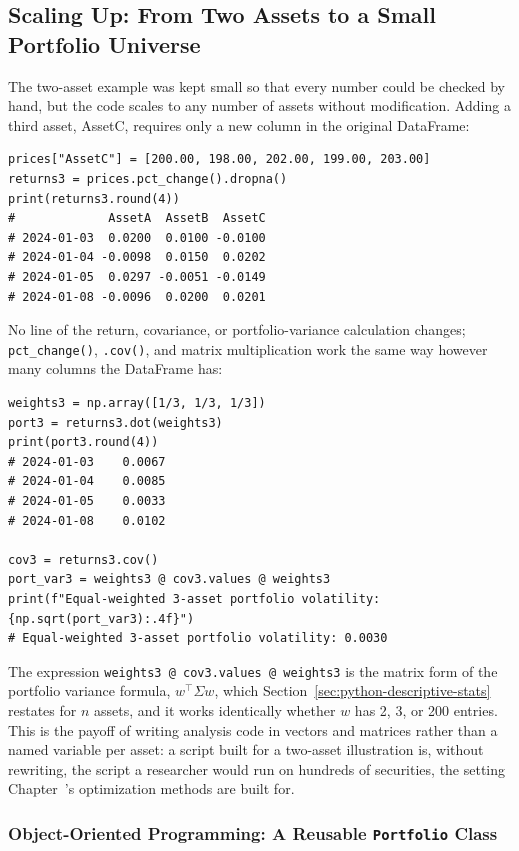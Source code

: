 \documentclass[../ai_in_finance]{subfiles}
\begin{document}
\subsection{Scaling Up: From Two Assets to a Small Portfolio Universe}

The two-asset example was kept small so that every number could be checked by hand, but the code scales to any number of assets without modification. Adding a third asset, AssetC, requires only a new column in the original DataFrame:

\begin{verbatim}
prices["AssetC"] = [200.00, 198.00, 202.00, 199.00, 203.00]
returns3 = prices.pct_change().dropna()
print(returns3.round(4))
#             AssetA  AssetB  AssetC
# 2024-01-03  0.0200  0.0100 -0.0100
# 2024-01-04 -0.0098  0.0150  0.0202
# 2024-01-05  0.0297 -0.0051 -0.0149
# 2024-01-08 -0.0096  0.0200  0.0201
\end{verbatim}

No line of the return, covariance, or portfolio-variance calculation changes; \texttt{pct\_change()}, \texttt{.cov()}, and matrix multiplication work the same way however many columns the DataFrame has:

\begin{verbatim}
weights3 = np.array([1/3, 1/3, 1/3])
port3 = returns3.dot(weights3)
print(port3.round(4))
# 2024-01-03    0.0067
# 2024-01-04    0.0085
# 2024-01-05    0.0033
# 2024-01-08    0.0102

cov3 = returns3.cov()
port_var3 = weights3 @ cov3.values @ weights3
print(f"Equal-weighted 3-asset portfolio volatility: {np.sqrt(port_var3):.4f}")
# Equal-weighted 3-asset portfolio volatility: 0.0030
\end{verbatim}

The expression \texttt{weights3 @ cov3.values @ weights3} is the matrix form of the portfolio variance formula, $w^\top \Sigma w$, which Section~\ref{sec:python-descriptive-stats} restates for $n$ assets, and it works identically whether $w$ has 2, 3, or 200 entries. This is the payoff of writing analysis code in vectors and matrices rather than a named variable per asset: a script built for a two-asset illustration is, without rewriting, the script a researcher would run on hundreds of securities, the setting Chapter~'s optimization methods are built for.

\subsubsection*{Object-Oriented Programming: A Reusable \texttt{Portfolio} Class}
\end{document}
